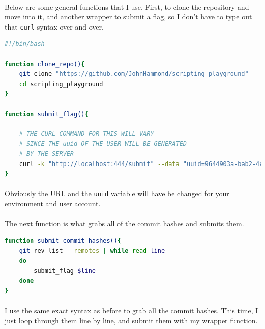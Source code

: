\documentclass[11pt]{article}
\begin{document}
	\paragraph{} Below are some general functions that I use. First, to clone the repository and move into it, and another wrapper to submit a flag, so I don't have to type out that \texttt{curl} syntax over and over.

\begin{lstlisting}[language=Bash]
#!/bin/bash

function clone_repo(){
	git clone "https://github.com/JohnHammond/scripting_playground"
	cd scripting_playground
}

function submit_flag(){

	# THE CURL COMMAND FOR THIS WILL VARY
	# SINCE THE uuid OF THE USER WILL BE GENERATED
	# BY THE SERVER
	curl -k "http://localhost:444/submit" --data "uuid=9644903a-bab2-4eb9-b0b3-d83c7a65c305&flag=$1"
}
\end{lstlisting}

	\paragraph{} Obviously the URL and the \texttt{uuid} variable will have be changed for your environment and user account.

	\paragraph{} The next function is what grabs all of the commit hashes and submits them. \\

	\begin{lstlisting}[language=Bash]
function submit_commit_hashes(){
	git rev-list --remotes | while read line
	do
		submit_flag $line
	done
}
\end{lstlisting}

	\paragraph{} I use the same exact syntax as before to grab all the commit hashes. This time, I just loop through them line by line, and submit them with my wrapper function. \\

	\begin{center}
		\graphicspath{ {.} }
		\centering
	\end{center}
\end{document}
